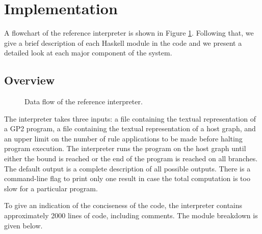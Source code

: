 \section{Implementation}

A flowchart of the reference interpreter is shown in Figure \ref{fig:architecture}. Following that, we give a brief description of each Haskell module in the code and we present a detailed look at each major component of the system.

\subsection{Overview}

\begin{figure}
\centering

\caption{Data flow of the reference interpreter.} \label{fig:architecture}
\end{figure}

The interpreter takes three inputs: a file containing the textual representation of a GP2 program, a file containing the textual representation of a host graph, and an upper limit on the number of rule applications to be made before halting program execution. The interpreter runs the program on the host graph until either the bound is reached or the end of the program is reached on all branches. The default output is a complete description of all possible outputs. There is a command-line flag to print only one result in case the total computation is too slow for a particular program.

To give an indication of the conciseness of the code, the interpreter contains approximately 2000 lines of code, including comments. The module breakdown is given below.

